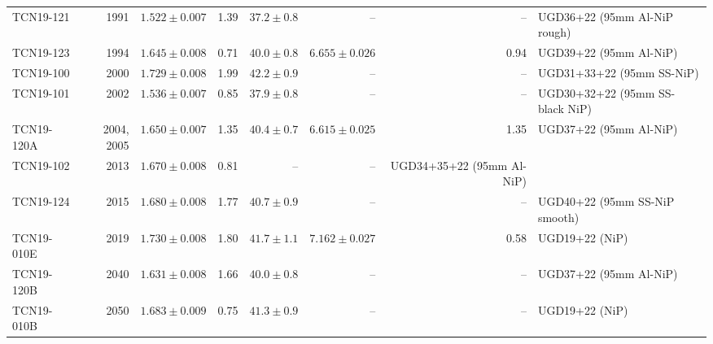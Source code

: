 \documentclass[10pt,letterpaper]{article}
\begin{document}
\begin{table}
\begin{tabular}{l r r r r r r l}
TCN19-121 & 1991 & $1.522 \pm 0.007$ & 1.39 & $37.2 \pm 0.8$ & -- & -- & UGD36+22 (95mm Al-NiP rough) \\
TCN19-123 & 1994 & $1.645 \pm 0.008$ & 0.71 & $40.0 \pm 0.8$ & $6.655 \pm 0.026$ & 0.94 & UGD39+22 (95mm Al-NiP) \\
TCN19-100 & 2000 & $1.729 \pm 0.008$ & 1.99 & $42.2 \pm 0.9$ & -- & -- & UGD31+33+22 (95mm SS-NiP) \\
TCN19-101 & 2002 & $1.536 \pm 0.007$ & 0.85 & $37.9 \pm 0.8$ & -- & -- & UGD30+32+22 (95mm SS-black NiP) \\
TCN19-120A & 2004, 2005 & $1.650 \pm 0.007$ & 1.35 & $40.4 \pm 0.7$ & $6.615 \pm 0.025$ & 1.35 & UGD37+22 (95mm Al-NiP) \\
TCN19-102 & 2013 & $1.670 \pm 0.008$ & 0.81 & -- & -- & UGD34+35+22 (95mm Al-NiP) \\
TCN19-124 & 2015 & $1.680 \pm 0.008$ & 1.77 & $40.7 \pm 0.9$ & -- & -- & UGD40+22 (95mm SS-NiP smooth) \\
TCN19-010E & 2019 & $1.730 \pm 0.008$ & 1.80 & $41.7 \pm 1.1$ & $7.162 \pm 0.027$ & 0.58 & UGD19+22 (NiP) \\
TCN19-120B & 2040 & $1.631 \pm 0.008$ & 1.66 & $40.0 \pm 0.8$ & -- & -- & UGD37+22 (95mm Al-NiP) \\
TCN19-010B & 2050 & $1.683 \pm 0.009$ & 0.75 & $41.3 \pm 0.9$ & -- & -- & UGD19+22 (NiP) \\
\bottomrule
\end{tabular}
\label{tab:transmission}
\end{table}
\end{document}

